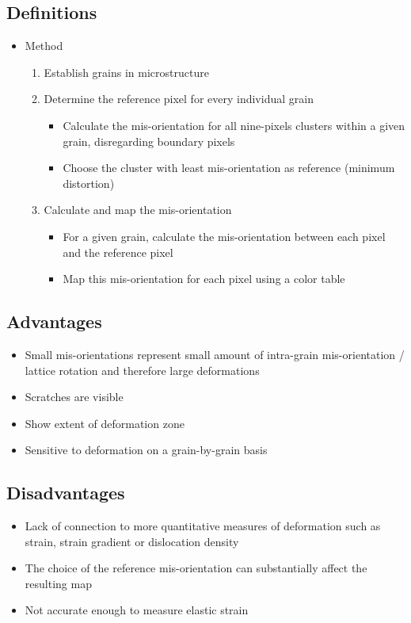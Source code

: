 \documentclass[letterpaper]{article}
\begin{document}
		\subsection{Definitions}
			\begin{itemize}
				\item Method \cite{Brewer2006}
					\begin{enumerate}
						\item Establish grains in microstructure
						\item Determine the reference pixel for every individual grain
							\begin{itemize}
								\item Calculate the mis-orientation for all nine-pixels clusters within a given grain, disregarding boundary pixels
								\item Choose the cluster with least mis-orientation as reference (minimum distortion)
							\end{itemize}
						\item Calculate and map the mis-orientation
							\begin{itemize}
								\item For a given grain, calculate the mis-orientation between each pixel and the reference pixel
								\item Map this mis-orientation for each pixel using a color table
							\end{itemize}
					\end{enumerate}
			\end{itemize}
	
		\subsection{Advantages}
			\begin{itemize}
				\item Small mis-orientations represent small amount of intra-grain mis-orientation / lattice rotation and therefore large deformations \cite{Brewer2006}
				\item Scratches are visible \cite{Brewer2006}
				\item Show extent of deformation zone \cite{Brewer2006}
				\item Sensitive to deformation on a grain-by-grain basis \cite{Brewer2006}
			\end{itemize}
		
		\subsection{Disadvantages}
			\begin{itemize}
				\item Lack of connection to more quantitative measures of deformation such as strain, strain gradient or dislocation density \cite{Brewer2006}
				\item The choice of the reference mis-orientation can substantially affect the resulting map \cite{Brewer2006}
				\item Not accurate enough to measure elastic strain \cite{Brewer2006}
			\end{itemize}
	
\newpage
	
	
\end{document}
